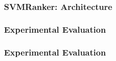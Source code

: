 \documentclass[11pt]{beamer}
\begin{document}
\begin{frame}\frametitle{SVMRanker: Architecture}

\end{frame}

\begin{frame}\frametitle{Experimental Evaluation}

\end{frame}

\begin{frame}\frametitle{Experimental Evaluation}

\end{frame}
\end{document}
